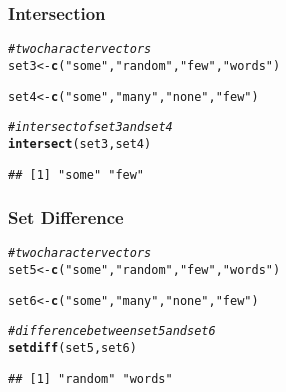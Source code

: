 \documentclass[12pt]{beamer}\usepackage[]{graphicx}\usepackage[]{color}
\makeatletter
\newcommand{\hlstr}[1]{\textcolor[rgb]{0.192,0.494,0.8}{#1}}%
\newcommand{\hlcom}[1]{\textcolor[rgb]{0.678,0.584,0.686}{\textit{#1}}}%
\newcommand{\hlstd}[1]{\textcolor[rgb]{0.345,0.345,0.345}{#1}}%
\newcommand{\hlkwb}[1]{\textcolor[rgb]{0.69,0.353,0.396}{#1}}%
\newcommand{\hlkwd}[1]{\textcolor[rgb]{0.737,0.353,0.396}{\textbf{#1}}}%
\newenvironment{kframe}{%
 \def\at@end@of@kframe{}%
 \ifinner\ifhmode%
  \def\at@end@of@kframe{\end{minipage}}%
  \begin{minipage}{\columnwidth}%
 \fi\fi%
 \def\FrameCommand##1{\hskip\@totalleftmargin \hskip-\fboxsep
 \colorbox{shadecolor}{##1}\hskip-\fboxsep
     \hskip-\linewidth \hskip-\@totalleftmargin \hskip\columnwidth}%
 \MakeFramed {\advance\hsize-\width
   \@totalleftmargin\z@ \linewidth\hsize
   \@setminipage}}%
 {\par\unskip\endMakeFramed%
 \at@end@of@kframe}
\newenvironment{knitrout}{}{} %
\makeatother
\begin{document}

\begin{frame}[fragile]
\frametitle{Intersection}

\begin{knitrout}\footnotesize
{}\color{fgcolor}\begin{kframe}
\begin{alltt}
\hlcom{# two character vectors}
\hlstd{set3} \hlkwb{<-} \hlkwd{c}\hlstd{(}\hlstr{"some"}\hlstd{,} \hlstr{"random"}\hlstd{,} \hlstr{"few"}\hlstd{,} \hlstr{"words"}\hlstd{)}

\hlstd{set4} \hlkwb{<-} \hlkwd{c}\hlstd{(}\hlstr{"some"}\hlstd{,} \hlstr{"many"}\hlstd{,} \hlstr{"none"}\hlstd{,} \hlstr{"few"}\hlstd{)}

\hlcom{# intersect of set3 and set4}
\hlkwd{intersect}\hlstd{(set3, set4)}
\end{alltt}
\begin{verbatim}
## [1] "some" "few"
\end{verbatim}
\end{kframe}
\end{knitrout}

\end{frame}


\begin{frame}[fragile]
\frametitle{Set Difference}

\begin{knitrout}\footnotesize
{}\color{fgcolor}\begin{kframe}
\begin{alltt}
\hlcom{# two character vectors}
\hlstd{set5} \hlkwb{<-} \hlkwd{c}\hlstd{(}\hlstr{"some"}\hlstd{,} \hlstr{"random"}\hlstd{,} \hlstr{"few"}\hlstd{,} \hlstr{"words"}\hlstd{)}

\hlstd{set6} \hlkwb{<-} \hlkwd{c}\hlstd{(}\hlstr{"some"}\hlstd{,} \hlstr{"many"}\hlstd{,} \hlstr{"none"}\hlstd{,} \hlstr{"few"}\hlstd{)}

\hlcom{# difference between set5 and set6}
\hlkwd{setdiff}\hlstd{(set5, set6)}
\end{alltt}
\begin{verbatim}
## [1] "random" "words"
\end{verbatim}
\end{kframe}
\end{knitrout}

\end{frame}
\end{document}
